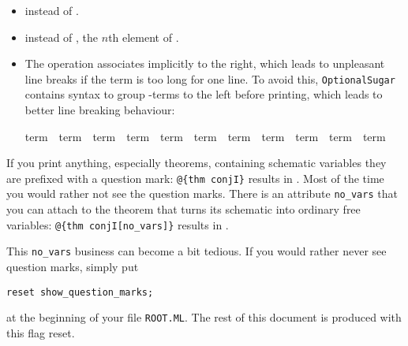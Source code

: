 \begin{isabellebody}
\begin{isamarkuptext}
\begin{itemize}
\item {} instead of .
\item {} instead of ,
      the $n$th element of .

\item The \isa{{\isacharat}} operation associates implicitly to the right,
which leads to unpleasant line breaks if the term is too long for one
line. To avoid this, \texttt{OptionalSugar} contains syntax to group
\isa{{\isacharat}}-terms to the left before printing, which leads to better
line breaking behaviour:
\begin{isabelle}%
term\ \isacharat\ term\ \isacharat\ term\ \isacharat\ term\ \isacharat\ term\ \isacharat\ term\ \isacharat\ term\ \isacharat\ term\ \isacharat\ term\ \isacharat\ term\ \isacharat\ term%
\end{isabelle}

\end{itemize}%
\end{isamarkuptext}%
\isamarkuptrue%
%
\isamarkuptrue%
%
\isamarkuptrue%
%
\begin{isamarkuptext}%
If you print anything, especially theorems, containing
schematic variables they are prefixed with a question mark:
\verb!@!\verb!{thm conjI}! results in . Most of the time
you would rather not see the question marks. There is an attribute
\verb!no_vars! that you can attach to the theorem that turns its
schematic into ordinary free variables: \verb!@!\verb!{thm conjI[no_vars]}!
results in .

This \verb!no_vars! business can become a bit tedious.
If you would rather never see question marks, simply put
\begin{verbatim}
reset show_question_marks;
\end{verbatim}
at the beginning of your file \texttt{ROOT.ML}.
The rest of this document is produced with this flag reset.


\end{isamarkuptext}
\end{isabellebody}
